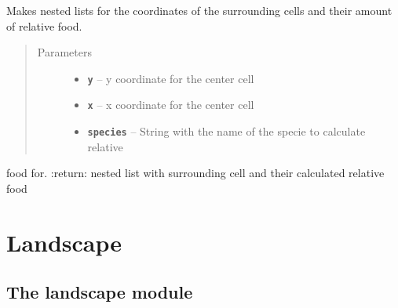 \documentclass[a4paper,10pt,openany,oneside]{sphinxmanual}
\begin{document}
\begin{fulllineitems}
\begin{fulllineitems}
\begin{quote}
\begin{description}
\end{description}\end{quote}

\end{fulllineitems}


\begin{fulllineitems}
\label{island:biosim.island.Island.surrounding_cells_relative_food}
Makes nested lists for the coordinates of the surrounding cells and
their amount of relative food.
\begin{quote}\begin{description}
\item[{Parameters}] \leavevmode\begin{itemize}
\item {} 
\textbf{\texttt{y}} -- y coordinate for the center cell

\item {} 
\textbf{\texttt{x}} -- x coordinate for the center cell

\item {} 
\textbf{\texttt{species}} -- String with the name of the specie to calculate relative

\end{itemize}

\end{description}\end{quote}

food for.
:return: nested list with surrounding cell and their calculated relative
food

\end{fulllineitems}


\end{fulllineitems}



\chapter{Landscape}
\label{landscape::doc}\label{landscape:landscape}

\section{The landscape module}
\label{landscape:module-biosim.landscape}\label{landscape:the-landscape-module}
\end{document}
